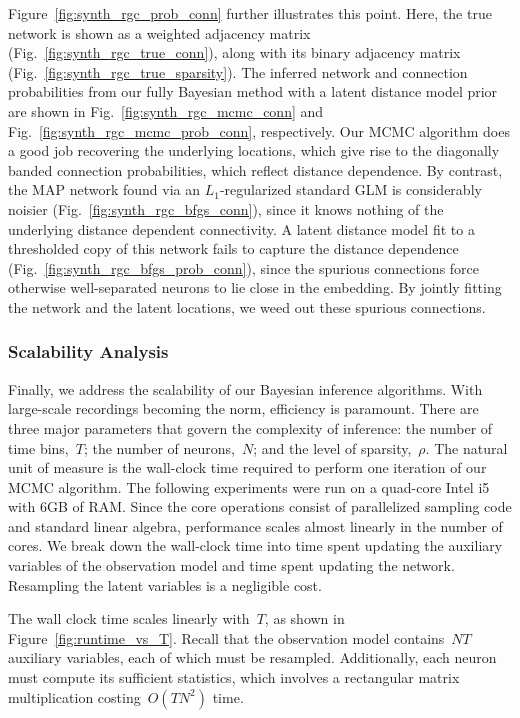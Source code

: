 Figure~\ref{fig:synth_rgc_prob_conn} further illustrates this
point. Here, the true network is shown as a weighted adjacency matrix
(Fig.~\ref{fig:synth_rgc_true_conn}), along with its binary adjacency
matrix (Fig.~\ref{fig:synth_rgc_true_sparsity}). The inferred network
and connection probabilities from our fully Bayesian method with a
latent distance model prior are shown in
Fig.~\ref{fig:synth_rgc_mcmc_conn} and
Fig.~\ref{fig:synth_rgc_mcmc_prob_conn}, respectively. Our MCMC
algorithm does a good job recovering the underlying locations, which
give rise to the diagonally banded connection probabilities, which reflect 
distance dependence.  By
contrast, the MAP network found via an $L_1$-regularized standard GLM
is considerably noisier (Fig.~\ref{fig:synth_rgc_bfgs_conn}), since it
knows nothing of the underlying distance dependent connectivity. A
latent distance model fit to a thresholded copy of this network fails
to capture the distance dependence
(Fig.~\ref{fig:synth_rgc_bfgs_prob_conn}), since the spurious
connections force otherwise well-separated neurons to lie close in the
embedding. By jointly fitting the network and the latent locations, we
weed out these spurious connections.

\subsubsection{Scalability Analysis}

Finally, we address the scalability of our Bayesian inference algorithms.
With large-scale recordings becoming the norm, efficiency is paramount.
There are three major parameters that govern the complexity of inference:
the number of time bins,~$T$; the number of neurons,~$N$; and the level
of sparsity,~$\rho$. The natural unit of measure is the wall-clock time
required to perform one iteration of our MCMC algorithm. The following
experiments were run on a quad-core Intel i5 with 6GB of RAM. Since the
core operations consist of parallelized sampling code and standard linear
algebra, performance scales almost linearly in the number of cores. We
break down the wall-clock time into time spent updating the auxiliary
variables of the observation model and time spent updating the network.
Resampling the latent variables is a negligible cost.

The wall clock time scales linearly with~$T$, as shown in
Figure~\ref{fig:runtime_vs_T}. Recall that the observation model
contains~${NT}$ auxiliary variables, each of which must be
resampled. Additionally, each neuron must compute its sufficient
statistics, which involves a rectangular matrix multiplication
costing~$O(TN^2)$ time.

